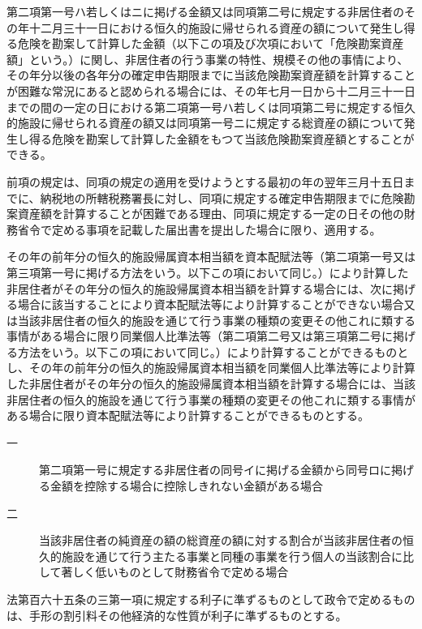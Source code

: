 \documentclass[twocolumn,a4j,10pt]{ltjtarticle}
\begin{document}
\begin{description}
\begin{description}
\begin{description}
\end{description}
\end{description}
\item[\rensuji{4}]第二項第一号ハ若しくはニに掲げる金額又は同項第二号に規定する非居住者のその年十二月三十一日における恒久的施設に帰せられる資産の額について発生し得る危険を勘案して計算した金額（以下この項及び次項において「危険勘案資産額」という。）に関し、非居住者の行う事業の特性、規模その他の事情により、その年分以後の各年分の確定申告期限までに当該危険勘案資産額を計算することが困難な常況にあると認められる場合には、その年七月一日から十二月三十一日までの間の一定の日における第二項第一号ハ若しくは同項第二号に規定する恒久的施設に帰せられる資産の額又は同項第一号ニに規定する総資産の額について発生し得る危険を勘案して計算した金額をもつて当該危険勘案資産額とすることができる。
\item[\rensuji{5}]前項の規定は、同項の規定の適用を受けようとする最初の年の翌年三月十五日までに、納税地の所轄税務署長に対し、同項に規定する確定申告期限までに危険勘案資産額を計算することが困難である理由、同項に規定する一定の日その他の財務省令で定める事項を記載した届出書を提出した場合に限り、適用する。
\item[\rensuji{6}]その年の前年分の恒久的施設帰属資本相当額を資本配賦法等（第二項第一号又は第三項第一号に掲げる方法をいう。以下この項において同じ。）により計算した非居住者がその年分の恒久的施設帰属資本相当額を計算する場合には、次に掲げる場合に該当することにより資本配賦法等により計算することができない場合又は当該非居住者の恒久的施設を通じて行う事業の種類の変更その他これに類する事情がある場合に限り同業個人比準法等（第二項第二号又は第三項第二号に掲げる方法をいう。以下この項において同じ。）により計算することができるものとし、その年の前年分の恒久的施設帰属資本相当額を同業個人比準法等により計算した非居住者がその年分の恒久的施設帰属資本相当額を計算する場合には、当該非居住者の恒久的施設を通じて行う事業の種類の変更その他これに類する事情がある場合に限り資本配賦法等により計算することができるものとする。
\begin{description}
\item[一]第二項第一号に規定する非居住者の同号イに掲げる金額から同号ロに掲げる金額を控除する場合に控除しきれない金額がある場合
\item[二]当該非居住者の純資産の額の総資産の額に対する割合が当該非居住者の恒久的施設を通じて行う主たる事業と同種の事業を行う個人の当該割合に比して著しく低いものとして財務省令で定める場合
\end{description}
\item[\rensuji{7}]法第百六十五条の三第一項に規定する利子に準ずるものとして政令で定めるものは、手形の割引料その他経済的な性質が利子に準ずるものとする。

\end{description}
\end{document}
